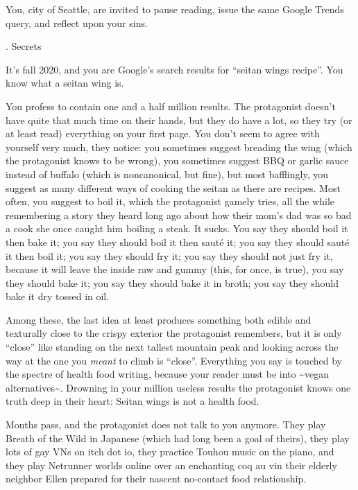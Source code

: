 \documentclass[12pt]{article}
\newcommand\chapter[2]{{\thispagestyle{empty} \Large \sc #1. \quad #2

\vspace{1.5em}}}
\begin{document}
You, city of Seattle, are invited to pause reading, issue the same Google Trends query, and reflect upon your sins.

\newpage \thispagestyle{empty}

\chapter{2}{Secrets}

It's fall 2020, and you are Google's search results for ``seitan wings recipe''.
You know what a seitan wing is.

You profess to contain one and a half million results.
The protagonist doesn't have quite that much time on their hands,
but they do have a lot, so they try (or at least read) everything on your first page.
You don't seem to agree with yourself very much, they notice:
you sometimes suggest breading the wing (which the protagonist knows to be wrong),
you sometimes suggest BBQ or garlic sauce instead of buffalo (which is noncanonical, but fine),
but most bafflingly, you suggest as many different ways of cooking the seitan as there are recipes.
Most often, you suggest to boil it,
which the protagonist gamely tries,
all the while remembering a story they heard long ago about how their mom's dad was so bad a cook she once caught him boiling a steak.
It sucks.
You say they should boil it then bake it;
you say they should boil it then saut\'e it;
you say they should saut\'e it then boil it;
you say they should fry it;
you say they should not just fry it, because it will leave the inside raw and gummy (this, for once, is true),
you say they should bake it;
you say they should bake it in broth;
you say they should bake it dry tossed in oil.

Among these, the last idea at least produces something both edible and texturally close to the crispy exterior the protagonist remembers, but it is only ``close'' like standing on the next tallest mountain peak and looking across the way at the one you {\em meant} to climb is ``close''.
Everything you say is touched by the spectre of health food writing,
because your reader must be into \textasciitilde{}vegan alternatives\textasciitilde{}.
Drowning in your million useless results the protagonist knows one truth deep in their heart: Seitan wings is not a health food.

Months pass, and the protagonist does not talk to you anymore.
They play Breath of the Wild in Japanese (which had long been a goal of theirs),
they play lots of gay VNs on itch dot io,
they practice Touhou music on the piano,
and they play Netrunner worlds online over an enchanting coq au vin their elderly neighbor Ellen prepared for their nascent no-contact food relationship.
\end{document}
